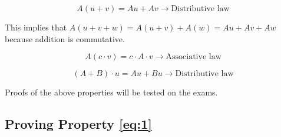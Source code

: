 \documentclass[12pt]{article}
\begin{document}
\begin{equation}
  A(u+v) = Au + Av \to \text{Distributive law}
  \label{eq:1}
\end{equation}

This implies that $A(u+v+w) = A(u+v) + A(w) = Au + Av + Aw$ because addition is
commutative.

\begin{equation}
  A(c \cdot v) = c \cdot A \cdot v \to \text{Associative law}
\end{equation}

\begin{equation}
  (A+B)\cdot u = Au + Bu \to \text{Distributive law}
\end{equation}

Proofs of the above properties will be tested on the exams.

\subsection{Proving Property \ref{eq:1}}




\end{document}
